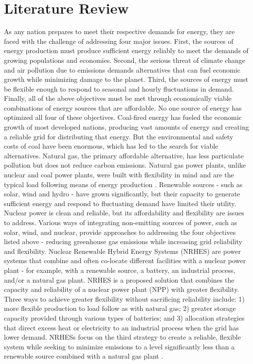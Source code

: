 \documentclass[12pt]{UIdahoMastersThesis}
\begin{document}
\clearpage
\chapter{Literature Review}
\label{Introduction to Nuclear Renewable Hybrid Energy Systems}

As any nation prepares to meet their respective demands for energy, they are faced with the challenge of addressing four major issues. First, the sources of energy production must produce sufficient energy reliably to meet the demands of growing populations and economies. Second, the serious threat of climate change and air pollution due to emissions demands alternatives that can fuel economic growth while minimizing damage to the planet. Third, the sources of energy must be flexible enough to respond to seasonal and hourly fluctuations in demand. Finally, all of the above objectives must be met through economically viable combinations of energy sources that are affordable.
No one source of energy has optimized all four of these objectives. Coal-fired energy has fueled the economic growth of most developed nations, producing vast amounts of energy and creating a reliable grid for distributing that energy. But the environmental and safety costs of coal have been enormous, which has led to the search for viable alternatives. Natural gas, the primary affordable alternative, has less particulate pollution but does not reduce carbon emissions. Natural gas power plants, unlike nuclear and coal power plants, were built with flexibility in mind and are the typical load following means of energy production \cite{MITEnergyInitiative2011}. Renewable sources - such as solar, wind and hydro - have grown significantly, but their capacity to generate sufficient energy and respond to fluctuating demand have limited their utility. Nuclear power is clean and reliable, but its affordability and flexibility are issues to address.
Various ways of integrating non-emitting sources of power, such as solar, wind, and nuclear, provide approaches to addressing the four objectives listed above - reducing greenhouse gas emissions while increasing grid reliability and flexibility. Nuclear Renewable Hybrid Energy Systems (NRHES) are power systems that combine and often co-locate different facilities with a nuclear power plant - for example, with a renewable source, a battery, an industrial process, and/or a natural gas plant.  NRHES is a proposed solution that combines the capacity and reliability of a nuclear power plant (NPP) with greater flexibility.  Three ways to achieve greater flexibility without sacrificing reliability include: 1) more flexible production to load follow as with natural gas; 2) greater storage capacity provided through various types of batteries; and 3)  allocation strategies that direct excess heat or electricity to an industrial process when the grid has lower demand. NRHESs focus on the third strategy to create a reliable, flexible system while seeking to minimize emissions to a level significantly less than a renewable source combined with a natural gas plant \cite{Baker2016}.
\end{document}
